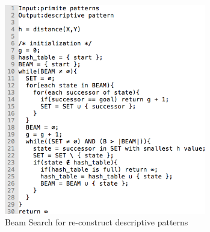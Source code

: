 \begin{figure}[!h]
\centering
\includegraphics[width=250pt]{./pictures/0306-2.png}
\caption{Beam Search for re-construct descriptive patterns}
\end{figure}
